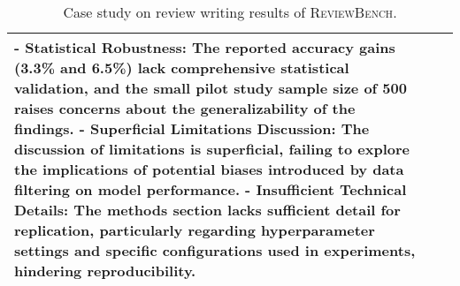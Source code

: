 \begin{table*}[htbp]
\begin{tabular}{p{3cm}p{6cm}p{6cm}}
- Statistical Robustness: The reported accuracy gains (3.3\% and 6.5\%) lack comprehensive statistical validation, and the small pilot study sample size of 500 raises concerns about the generalizability of the findings.\newline
- Superficial Limitations Discussion: The discussion of limitations is superficial, failing to explore the implications of potential biases introduced by data filtering on model performance.\newline
- Insufficient Technical Details: The methods section lacks sufficient detail for replication, particularly regarding hyperparameter settings and specific configurations used in experiments, hindering reproducibility.



\\
\bottomrule[1.1pt]
\end{tabular}
\caption{Case study on review writing results of \textsc{ReviewBench}.}
\label{tab:reviewbench}
\end{table*}











